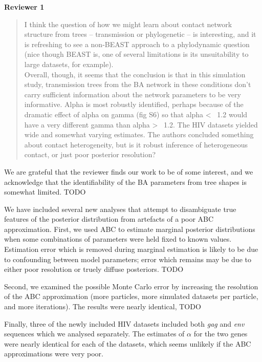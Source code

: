 \documentclass[12pt]{letter}
\begin{document}
\begin{letter}{ }
\textbf{Reviewer 1}

\begin{quote}
  \itshape

  I think the question of how we might learn about contact network structure
  from trees -- transmission or phylogenetic -- is interesting, and it is
  refreshing to see a non-BEAST approach to a phylodynamic question (nice
  though BEAST is, one of several limitations is its unsuitability to large
  datasets, for example). \\

  Overall, though, it seems that the conclusion is that in this simulation
  study, transmission trees from the BA network in these conditions don't carry
  sufficient information about the network parameters to be very informative.
  Alpha is most robustly identified, perhaps because of the dramatic effect of
  alpha on gamma (fig S6) so that alpha < ~1.2 would have a very different
  gamma than alpha > ~1.2. The HIV datasets yielded wide and somewhat varying
  estimates. The authors concluded something about contact heterogeneity, but
  is it robust inference of heterogeneous contact, or just poor posterior
  resolution?
\end{quote}

We are grateful that the reviewer finds our work to be of some interest, and we
acknowledge that the identifiability of the BA parameters from tree shapes is
somewhat limited. TODO

We have included several new analyses that attempt to disambiguate true
features of the posterior distribution from artefacts of a poor ABC
approximation. First, we used ABC to estimate marginal posterior distributions
when some combinations of parameters were held fixed to known values.
Estimation error which is removed during marginal estimation is likely to be
due to confounding between model parameters; error which remains may be due to
either poor resolution or truely diffuse posteriors. TODO

Second, we examined the possible Monte Carlo error by increasing the resolution
of the ABC approximation (more particles, more simulated datasets per particle,
and more iterations). The results were nearly identical, TODO

Finally, three of the newly included HIV datasets included both \textit{gag}
and \textit{env} sequences which we analysed separately. The estimates of
$\alpha$ for the two genes were nearly identical for each of the datasets,
which seems unlikely if the ABC approximations were very poor.


\end{letter}
\end{document}

